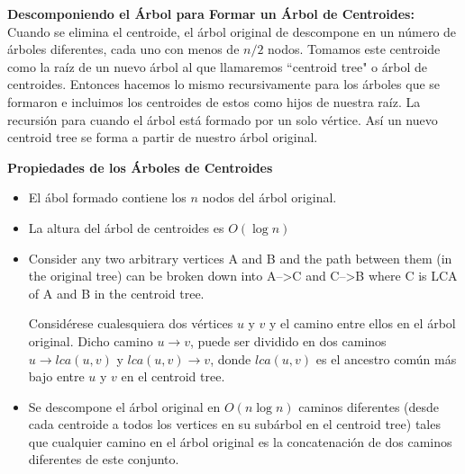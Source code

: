 \begin{itemize}
{		\item{
			\textbf{Descomponiendo el \'Arbol para Formar un \'Arbol de Centroides:}
			Cuando se elimina el centroide, el \'arbol original de descompone en un n\'umero de \'arboles
			diferentes, cada uno con menos de $n/2$ nodos. Tomamos este centroide como la ra\'iz de un nuevo 
			\'arbol al que llamaremos ``centroid tree" o \'arbol de centroides. Entonces hacemos lo mismo 
			recursivamente para los \'arboles que se formaron e incluimos los centroides de estos como hijos
			de nuestra ra\'iz. La recursi\'on para cuando el \'arbol est\'a formado por un solo v\'ertice.
			As\'i un nuevo centroid tree se forma a partir de nuestro \'arbol original.   
		}
		\item{
			\textbf{Propiedades de los \'Arboles de Centroides}
			\begin{itemize}
				\item{
					El \'abol formado contiene los $n$ nodos del \'arbol original.
				}
				\item{
					La altura del \'arbol de centroides es $O(\log n)$ 
				}
				\item{
					Consider any two arbitrary vertices A and B and the path between them (in the original tree) 
					can be broken down into A-->C and C-->B where C is LCA of A and B in the centroid tree.
					
					Consid\'erese cualesquiera dos v\'ertices $u$ y $v$ y el camino entre ellos en el \'arbol original.
					Dicho camino $ u \rightarrow v $, puede ser dividido en dos caminos $ u \rightarrow lca(u, v) $
					y $ lca(u, v) \rightarrow v $, donde $ lca(u, v) $ es el ancestro com\'un m\'as bajo entre $u$ y $v$
					en el centroid tree.   
				}
				\item{
					Se descompone el \'arbol original en $O(n \log n )$ caminos diferentes (desde cada centroide 
					a todos los vertices en su sub\'arbol en el centroid tree) tales que cualquier camino en el \'arbol 
					original es la concatenaci\'on de dos caminos diferentes de este conjunto.  
			   }
			\end{itemize}
		}
    }
\end{itemize}
